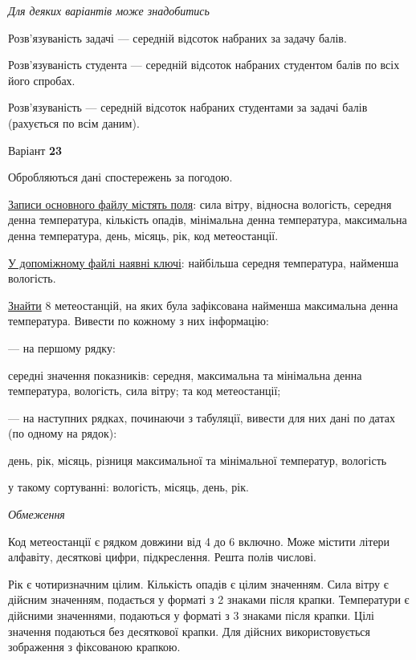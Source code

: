\documentclass[11pt, ukrainian]{article}
\begin{document}
\bigskip\textit{Для деяких варіантів може знадобитись}

Розв'язуваність задачі --- середній відсоток набраних за задачу балів.

Розв'язуваність студента --- середній відсоток набраних студентом балів по всіх його спробах.

Розв'язуваність --- середній відсоток набраних студентами за задачі балів (рахується по всім даним).




\par
\newpage
{\center Варіант  \No \textbf { 23 }\par}
\bigskip
Обробляються дані спостережень за погодою. 

\underline{Записи основного файлу містять поля}: сила вітру, відносна вологість, середня денна температура, кількість опадів, мінімальна денна температура, максимальна денна температура, день, місяць, рік, код метеостанції.

\underline{У допоміжному файлі наявні ключі}: найбільша середня температура, найменша вологість.

\underline{Знайти} 8 метеостанцій, на яких була зафіксована найменша максимальна денна температура. Вивести по кожному з них інформацію:\par
{\noindent}--- на першому рядку:\par
середні значення показників: середня, максимальна та мінімальна денна  температура, вологість, сила вітру; та код метеостанції;

{\noindent}--- на наступних рядках, починаючи з табуляції, вивести для них дані по датах (по одному на рядок):\par
день, рік, місяць, різниця максимальної та мінімальної температур, вологість

{\noindent}у такому сортуванні: вологість, місяць, день, рік.


\bigskip\textit{Обмеження}

Код метеостанції є рядком довжини від 4 до 6 включно.
Може містити літери алфавіту, десяткові цифри, підкреслення. Решта полів числові.

Рік є чотиризначним цілим.
Кількість опадів є цілим значенням.
Сила вітру є дійсним значенням, подається у форматі з 2 знаками після крапки.
Температури є дійсними значеннями, подаються у форматі з 3 знаками після крапки.
Цілі значення подаються без десяткової крапки.
Для дійсних використовується зображення з фіксованою крапкою.
\end{document}

